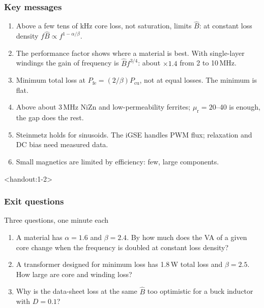\begin{frame}
	\frametitle{Key messages}
	\begin{enumerate}
		\item Above a few tens of kHz core loss, not saturation, limits $\hat{B}$: at constant loss density $f\hat{B}\propto f^{1-\alpha/\beta}$.
		\item The performance factor shows where a material is best. With single-layer windings the gain of frequency is $\hat{B}f^{3/4}$: about $\times1.4$ from 2 to 10\,MHz.
		\item Minimum total loss at $P_\mathrm{fe}=(2/\beta)P_\mathrm{cu}$, not at equal losses. The minimum is flat.
		\item Above about 3\,MHz NiZn and low-permeability ferrites; $\mu_\mathrm{r}=20$--40 is enough, the gap does the rest.
		\item Steinmetz holds for sinusoids. The iGSE handles PWM flux; relaxation and DC bias need measured data.
		\item Small magnetics are limited by efficiency: few, large components.
	\end{enumerate}
\end{frame}

\begin{frame}<handout:1-2>
	\frametitle{Exit questions}
	\begin{varblock}[\textwidth]{Three questions, one minute each}
		\begin{enumerate}
			\item A material has $\alpha=1.6$ and $\beta=2.4$. By how much does the VA of a given core change when the frequency is doubled at constant loss density?
			\item A transformer designed for minimum loss has 1.8\,W total loss and $\beta=2.5$. How large are core and winding loss?
			\item Why is the data-sheet loss at the same $\hat{B}$ too optimistic for a buck inductor with $D=0.1$?
		\end{enumerate}
	\end{varblock}
\end{frame}

